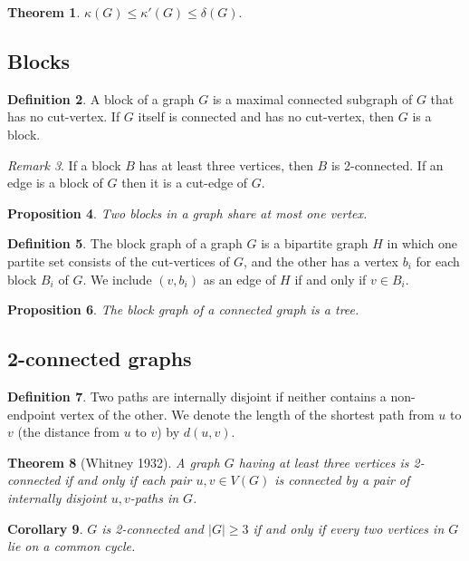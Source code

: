 \documentclass[10pt, fleqn, a4paper, landscape]{article}
\theoremstyle{plain} %
\newtheorem{thm}{Theorem}
\newtheorem{pro}[thm]{Proposition}
\newtheorem{cor}[thm]{Corollary}
\theoremstyle{remark} %
\newtheorem{rem}[thm]{Remark}
\theoremstyle{definition} %
\newtheorem{defi}[thm]{Definition}
\begin{document}
\begin{multicols}{3}
\begin{tiny}
\begin{thm}
$\kappa (G) \le \kappa'(G) \le \delta(G).$
\end{thm}

\subsection{Blocks}
\begin{defi}
A block of a graph $G$ is a maximal connected subgraph of $G$ that has no cut-vertex.
If $G$ itself is connected and has no cut-vertex, then $G$ is a block.
\end{defi}
\addtocounter{thm}{1}
\begin{rem}
If a block $B$ has at least three vertices, then $B$ is 2-connected. If an edge is a block of $G$ then it is a cut-edge of $G$.
\end{rem}

\begin{pro}
Two blocks in a graph share at most one vertex.
\end{pro}

\begin{defi}
The block graph of a graph $G$ is a bipartite graph $H$ in which one partite set consists of the cut-vertices of $G$, and the other has a vertex $b_i$ for each block $B_i$ of $G$. We include $(v, b_i)$ as an edge of $H$ if and only if $v \in B_i.$
\end{defi}
\addtocounter{thm}{1}
\begin{pro}
The block graph of a connected graph is a tree.
\end{pro}

\subsection{2-connected graphs}

\begin{defi}
Two paths are internally disjoint if neither contains a non-endpoint vertex of the other. We denote the length of the shortest path from $u$ to $v$ (the distance from $u$ to $v$) by $d(u, v)$.
\end{defi}

\begin{thm}[Whitney 1932]
A graph $G$ having at least three vertices is 2-connected if and only
if each pair $u, v \in V (G)$ is connected by a pair of internally disjoint $u, v$-paths in $G$.
\end{thm}

\begin{cor}
$G$ is 2-connected and $|G|\ge 3$ if and only if every two vertices in $G$ lie on a common cycle.
\end{cor}

\end{tiny}
\end{multicols}
\end{document}
